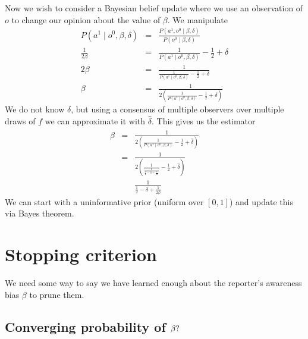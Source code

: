 \documentclass{amsart}
\theoremstyle{definition}
\theoremstyle{plain}
\numberwithin{equation}{section}
\begin{document}
Now we wish to consider a Bayesian belief update where we use an observation
of $o$ to change our opinion about the value of $\beta $. We manipulate%
\begin{eqnarray*}
P\left( a^{1}\mid o^{0},\beta ,\delta \right)  &=&\frac{P\left(
a^{1},o^{0}\mid \beta ,\delta \right) }{P\left( o^{0}\mid \beta ,\delta
\right) } \\
\frac{1}{2\beta } &=&\frac{1}{P\left( a^{1}\mid o^{0},\beta ,\delta \right) }%
-\frac{1}{2}+\delta  \\
2\beta  &=&\frac{1}{\frac{1}{P\left( a^{1}\mid o^{0},\beta ,\delta \right) }-%
\frac{1}{2}+\delta } \\
\beta  &=&\frac{1}{2\left( \frac{1}{P\left( a^{1}\mid o^{0},\beta ,\delta
\right) }-\frac{1}{2}+\delta \right) }
\end{eqnarray*}%
We do not know $\delta $, but using a consensus of multiple observers over
multiple draws of $f$ we can approximate it with $\hat{\delta}$. This gives
us the estimator%
\begin{eqnarray*}
\hat{\beta} &=&\frac{1}{2\left( \frac{1}{P\left( a^{1}\mid o^{0},\beta
,\delta \right) }-\frac{1}{2}+\hat{\delta}\right) } \\
&=&\frac{1}{2\left( \frac{1}{\frac{1}{\frac{1}{2}-\delta +\frac{1}{2\beta }}}%
-\frac{1}{2}+\hat{\delta}\right) } \\
&&\frac{1}{\frac{1}{2}-\delta +\frac{1}{2\beta }}
\end{eqnarray*}
We can start with a uninformative prior (uniform over $\left[ 0,1\right] $)
and update this via Bayes theorem.

\section{Stopping criterion}

We need some way to say we have learned enough about the reporter's
awareness bias $\beta $ to prune them. 

\subsection{Converging probability of $\protect\beta ?$}
\end{document}
